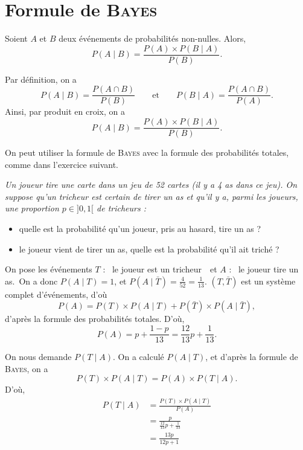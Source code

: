 \section{Formule de \textsc{Bayes}}

\begin{thm}
	Soient $A$\/ et $B$\/ deux événements de probabilités non-nulles. Alors, \[
		P(A  \mid B) = \frac{P(A) \times P(B  \mid A)}{P(B)}
	.\]
\end{thm}

\begin{prv}
	Par définition, on a \[
		P(A  \mid B) = \frac{P(A \cap B)}{P(B)} \qquad \text{et}\qquad
		P(B  \mid A) = \frac{P(A \cap B)}{P(A)}
	.\]
	Ainsi, par produit en croix, on a \[
		P(A  \mid B) = \frac{P(A) \times P(B  \mid A)}{P(B)}
	.\]
\end{prv}

\begin{met}
	On peut utiliser la formule de \textsc{Bayes} avec la formule des probabilités totales, comme dans l'exercice suivant.
\end{met}

\begin{exo}
	\begingroup\slshape
	Un joueur tire une carte dans un jeu de 52 cartes (il y a 4 as dans ce jeu). On suppose qu'un tricheur est certain de tirer un as et qu'il y a, parmi les joueurs, une proportion $p \in{]0, 1[}$ de tricheurs :
	\begin{itemize}
		\item quelle est la probabilité qu'un joueur, pris au hasard, tire un as ?
		\item le joueur vient de tirer un as, quelle est la probabilité qu'il ait triché ?
	\end{itemize}
	\endgroup
	\bigskip

	On pose les événements $T$\/ : \guillemotleft~le joueur est un tricheur~\guillemotright\ et $A$\/ : \guillemotleft~le joueur tire un as.~\guillemotright\@ On a donc $P(A  \mid T) = 1$, et $P(A  \mid \bar{T}) = \frac{4}{52} = \frac{1}{13}$. $(T, \bar{T})$\/ est un système complet d'événements, d'où \[
		P(A) = P(T) \times P(A  \mid T) + P(\bar{T}) \times P(A  \mid \bar{T})
	,\] d'après la formule des probabilités totales. D'où, \[
		P(A) = p + \frac{1-p}{13} = \frac{12}{13}p + \frac{1}{13}
	.\]

	On nous demande $P(T  \mid A)$. On a calculé $P(A  \mid T)$, et d'après la formule de \textsc{Bayes}, on a \[
		P(T) \times P(A  \mid T) = P(A) \times P(T  \mid A)
	.\] D'où,
	\begin{align*}
		P(T  \mid A) &= \frac{P(T) \times P(A  \mid T)}{P(A)}\\
		&= \frac{p}{\frac{12}{13}p + \frac{1}{13}} \\
		&= \frac{13p}{12p+1} \\
	\end{align*}
\end{exo}

